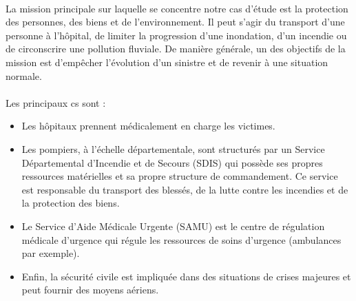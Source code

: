 \paragraph{}
La mission principale sur laquelle se concentre notre cas d'étude est la
protection des personnes, des biens et de
l’environnement. Il peut s'agir du
transport d'une personne à l'hôpital, de limiter la progression d'une
inondation, d'un incendie ou de circonscrire une pollution fluviale. De manière
générale, un des objectifs de la mission est d'empêcher l'évolution d'un sinistre et de revenir à
une situation normale.   

\paragraph{} 
Les principaux cs sont : 
\begin{itemize}
\item Les hôpitaux prennent médicalement en charge  les victimes.
\item Les pompiers, à l'échelle départementale, sont structurés par un Service
Dépar\-te\-mental d'Incendie et de Secours (SDIS) qui possède ses
propres ressources maté\-rielles et sa propre structure de commandement.
Ce service est  responsable du transport des blessés, de la lutte contre les
incendies et de la protection des biens.  
\item Le  Service d'Aide Médicale
Urgente (SAMU) est le centre de régulation médicale d'urgence qui régule les
ressources de soins d'urgence (ambulances par exemple).
\item Enfin, la sécurité civile est impliquée dans des situations de crises majeures et peut fournir des moyens aériens.
\end{itemize}



